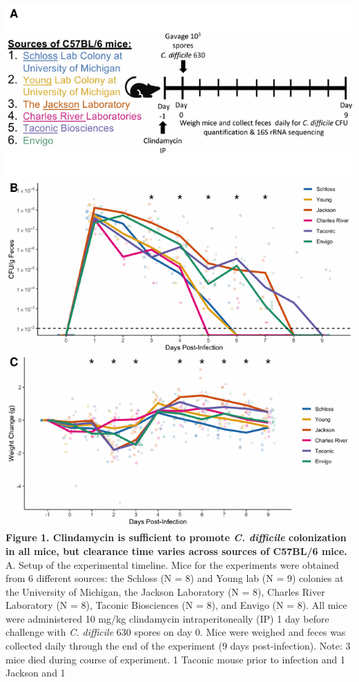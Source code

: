\documentclass[11pt,]{article}
\begin{document}
\includegraphics{figure_1.pdf} \textbf{Figure 1. Clindamycin is
sufficient to promote \emph{C. difficile} colonization in all mice, but
clearance time varies across sources of C57BL/6 mice.} A. Setup of the
experimental timeline. Mice for the experiments were obtained from 6
different sources: the Schloss (N = 8) and Young lab (N = 9) colonies at
the University of Michigan, the Jackson Laboratory (N = 8), Charles
River Laboratory (N = 8), Taconic Biosciences (N = 8), and Envigo (N =
8). All mice were administered 10 mg/kg clindamycin intraperitoneally
(IP) 1 day before challenge with \emph{C. difficile} 630 spores on day
0. Mice were weighed and feces was collected daily through the end of
the experiment (9 days post-infection). Note: 3 mice died during course
of experiment. 1 Taconic mouse prior to infection and 1 Jackson and 1
\end{document}
